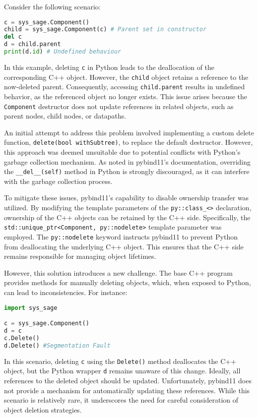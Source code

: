 Consider the following scenario:

  \begin{lstlisting}[language=Python, xleftmargin=4em, frame = single]
c = sys_sage.Component()
child = sys_sage.Component(c) # Parent set in constructor
del c
d = child.parent
print(d.id) # Undefined behaviour
  \end{lstlisting}

In this example, deleting \verb|c| in Python leads to the deallocation of the corresponding C++ object. However, the \verb|child| object retains a reference to the now-deleted parent. Consequently, accessing \verb|child.parent| results in undefined behavior, as the referenced object no longer exists. This issue arises because the \verb|Component| destructor does not update references in related objects, such as parent nodes, child nodes, or datapaths.

An initial attempt to address this problem involved implementing a custom delete function, \verb|delete(bool withSubtree)|, to replace the default destructor. However, this approach was deemed unsuitable due to potential conflicts with Python's garbage collection mechanism. As noted in pybind11's documentation, overriding the \verb|__del__(self)| method in Python is strongly discouraged, as it can interfere with the garbage collection process. \cite[see Chapter 12]{python-gc}

To mitigate these issues, pybind11's capability to disable ownership transfer was utilized. By modifying the template parameters of the \verb|py::class_<>| declaration, ownership of the C++ objects can be retained by the C++ side. Specifically, the \verb|std::unique_ptr<Component, py::nodelete>| template parameter was employed. The \verb|py::nodelete| keyword instructs pybind11 to prevent Python from deallocating the underlying C++ object. This ensures that the C++ side remains responsible for managing object lifetimes.

However, this solution introduces a new challenge. The base C++ program provides methods for manually deleting objects, which, when exposed to Python, can lead to inconsistencies. For instance:
\newpage
  \begin{lstlisting}[language=Python, xleftmargin=4em, frame = single]
import sys_sage

c = sys_sage.Component()
d = c
c.Delete()
d.Delete() #Segmentation Fault
  \end{lstlisting}
  

In this scenario, deleting \verb|c| using the \verb|Delete()| method deallocates the C++ object, but the Python wrapper \verb|d| remains unaware of this change. Ideally, all references to the deleted object should be updated. Unfortunately, pybind11 does not provide a mechanism for automatically updating these references. While this scenario is relatively rare, it underscores the need for careful consideration of object deletion strategies.

